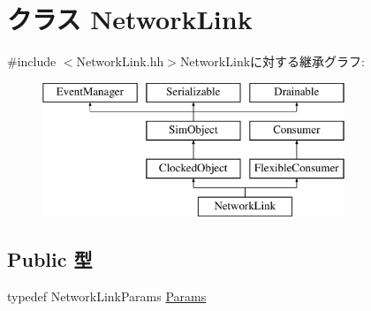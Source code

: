 \hypertarget{classNetworkLink}{
\section{クラス NetworkLink}
\label{classNetworkLink}
}


{\ttfamily \#include $<$NetworkLink.hh$>$}NetworkLinkに対する継承グラフ:\begin{figure}[H]
\begin{center}
\leavevmode
\includegraphics[height=4cm]{classNetworkLink}
\end{center}
\end{figure}
\subsection*{Public 型}
\begin{DoxyCompactItemize}
\item 
typedef NetworkLinkParams \hyperlink{classNetworkLink_a1da148687c9777c23a833785c588c749}{Params}
\end{DoxyCompactItemize}
